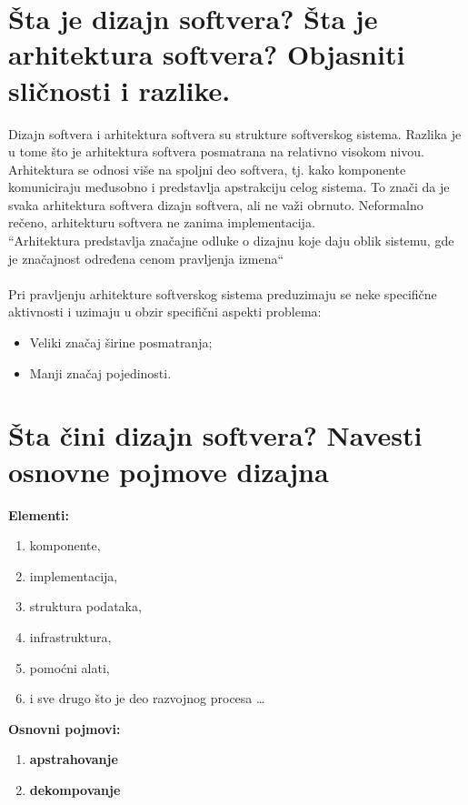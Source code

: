 \documentclass[a4paper]{article}
\begin{document}
\section{Šta je dizajn softvera? Šta je arhitektura softvera? Objasniti sličnosti i razlike.}
  \indent Dizajn softvera i arhitektura softvera su strukture softverskog sistema. Razlika je u
  tome što je arhitektura softvera posmatrana na relativno visokom nivou. Arhitektura se odnosi više
  na spoljni deo softvera, tj. kako komponente komuniciraju međusobno i predstavlja apstrakciju 
  celog sistema. To znači da je svaka arhitektura softvera dizajn softvera, ali ne važi obrnuto.
  Neformalno rečeno, arhitekturu softvera ne zanima implementacija. \\

  ``Arhitektura predstavlja značajne odluke o dizajnu koje daju oblik sistemu, gde je značajnost
  određena cenom pravljenja izmena``
  \\[5pt]
  \\

  Pri pravljenju arhitekture softverskog sistema preduzimaju se neke specifične aktivnosti i
  uzimaju u obzir specifični aspekti problema:
  \begin{itemize}
    \item Veliki značaj širine posmatranja;
    \item Manji značaj pojedinosti. 
  \end{itemize}

\section{Šta čini dizajn softvera? Navesti osnovne pojmove dizajna}
  \noindent \textbf{Elementi:}
  \begin{enumerate}
    \item komponente,
    \item implementacija,
    \item struktura podataka,
    \item infrastruktura,
    \item pomoćni alati,
    \item i sve drugo što je deo razvojnog procesa \dots
  \end{enumerate}
  \textbf{Osnovni pojmovi:}
  \begin{enumerate}
    \item \textbf{apstrahovanje}
    \item \textbf{dekompovanje}
  \end{enumerate}
\end{document}
